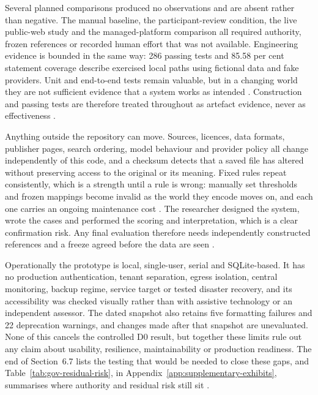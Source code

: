 Several planned comparisons produced no observations and are absent rather than negative. The manual
baseline, the participant-review condition, the live public-web study and the managed-platform
comparison all required authority, frozen references or recorded human effort that was not available.
Engineering evidence is bounded in the same way: 286 passing tests and 85.58 per cent statement
coverage describe exercised local paths using fictional data and fake providers. Unit and end-to-end
tests remain valuable, but in a changing world they are not sufficient evidence that a system works as
intended \citep{sculley2015debt,pineau2021reproducibility}. Construction and passing tests are
therefore treated throughout as artefact evidence, never as effectiveness
\citep{hevner2004design,peffers2007dsrm}.

Anything outside the repository can move. Sources, licences, data formats, publisher pages, search
ordering, model behaviour and provider policy all change independently of this code, and a checksum
detects that a saved file has altered without preserving access to the original or its meaning. Fixed
rules repeat consistently, which is a strength until a rule is wrong: manually set thresholds and
frozen mappings become invalid as the world they encode moves on, and each one carries an ongoing
maintenance cost \citep{sculley2015debt,gebru2021datasheets}. The researcher designed the system,
wrote the cases and performed the scoring and interpretation, which is a clear confirmation risk. Any
final evaluation therefore needs independently constructed references and a freeze agreed before the
data are seen \citep{nist2023airmf}.

Operationally the prototype is local, single-user, serial and SQLite-based. It has no production
authentication, tenant separation, egress isolation, central monitoring, backup regime, service target
or tested disaster recovery, and its accessibility was checked visually rather than with assistive
technology or an independent assessor. The dated snapshot also retains five formatting failures and 22
deprecation warnings, and changes made after that snapshot are unevaluated. None of this cancels the
controlled D0 result, but together these limits rule out any claim about usability, resilience,
maintainability or production readiness. The end of Section~6.7 lists the testing that would be
needed to close these gaps, and Table~\ref{tab:gov-residual-risk}, in
Appendix~\ref{app:supplementary-exhibits}, summarises where authority and residual risk still sit
\citep{hevner2004design,amershi2019guidelines}.
